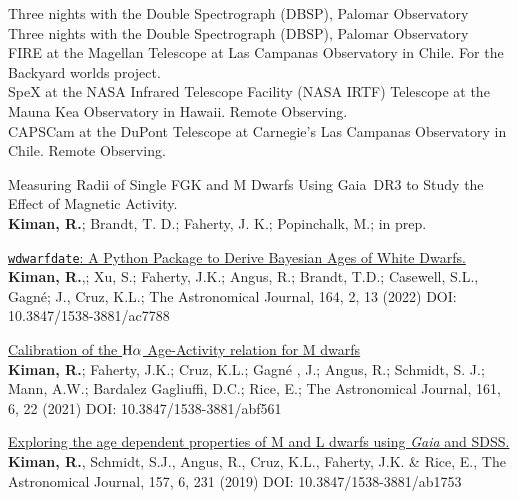 \documentclass[10pt]{cv}
\begin{document}
\begin{llist}

Three nights with the Double Spectrograph (DBSP), 
Palomar Observatory \\
Three nights with the Double Spectrograph (DBSP), 
Palomar Observatory \\
FIRE at the Magellan Telescope at Las Campanas Observatory
 in Chile. For the Backyard worlds project. \\
SpeX at the NASA Infrared Telescope Facility (NASA IRTF) 	
Telescope at the Mauna Kea Observatory in Hawaii. Remote Observing. \\
CAPSCam at the DuPont Telescope	
at Carnegie's Las Campanas Observatory in Chile. Remote Observing.




\begin{etaremune}
  \item Measuring Radii of Single FGK and M Dwarfs Using Gaia~DR3 to Study the Effect of Magnetic Activity.\\ \textbf{Kiman, R.}; Brandt, T. D.; Faherty, J. K.; Popinchalk, M.; in prep.
  \item \href{https://ui.adsabs.harvard.edu/abs/2022AJ....164...62K/abstract}{\texttt{wdwarfdate}: A Python Package to Derive Bayesian Ages of White Dwarfs.}\\ \textbf{Kiman, R.},; Xu, S.; Faherty, J.K.; Angus, R.; Brandt, T.D.; Casewell, S.L., Gagn\'e; J., Cruz, K.L.; The Astronomical Journal, 164, 2, 13 (2022) DOI: 10.3847/1538-3881/ac7788
  \item \href{https://ui.adsabs.harvard.edu/abs/2021AJ....161..277K/abstract}{Calibration of the ${\rm H}\alpha$ Age-Activity relation for M dwarfs}\\ \textbf{Kiman, R.}; Faherty, J.K.; Cruz, K.L.; Gagn\'e , J.; Angus, R.; Schmidt, S. J.; Mann, A.W.; Bardalez Gagliuffi, D.C.; Rice, E.; The Astronomical Journal, 161, 6, 22 (2021) DOI: 10.3847/1538-3881/abf561
  \item \href{https://ui.adsabs.harvard.edu/abs/2019AJ....157..231K/abstract}{Exploring the age dependent properties of M and L dwarfs using \textit{Gaia} and SDSS.}\\ \textbf{Kiman, R.}, Schmidt, S.J., Angus, R., Cruz, K.L., Faherty, J.K. \& Rice, E., The Astronomical Journal, 157, 6, 231 (2019) DOI: 10.3847/1538-3881/ab1753 
\end{etaremune}






\end{llist}
\end{document}
